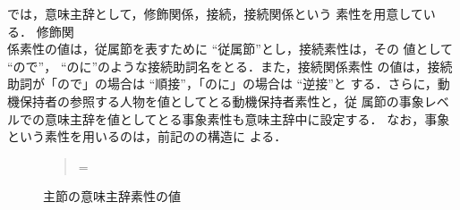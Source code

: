 では，意味主辞として，修飾関係，接続，接続関係という
素性を用意している．\vspace{-0.1mm}
修飾関\\係素性の値は，従属節を表すために ``従属節''とし，接続素性は，その
値として ``ので''， ``のに''のような接続助詞名をとる．\vspace{-0.1mm}また，接続関係素性
の値は，接続助詞が「ので」の場合は ``順接''，「のに」の場合は ``逆接''と
する．\vspace{-0.1mm}さらに，動機保持者の参照する人物を値としてとる動機保持者素性と，従
属節の事象レベルでの意味主辞を値としてとる事象素性も意味主辞中に設定する．\vspace{-0.1mm}
なお，事象という素性を用いるのは，前記のの構造に
よる．\vspace{-0.1mm}

\newsavebox{\myboxaaa}
\begin{figure}[htbp]
\footnotesize
\begin{quote}
=
\end{quote}
\caption{主節の意味主辞素性の値}
\end{figure}

